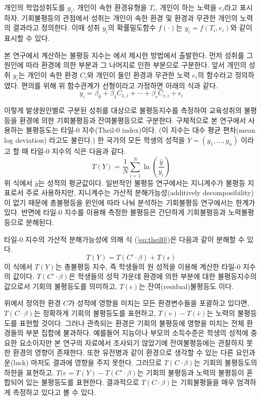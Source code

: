 개인의 학업성취도를 $y_i$, 개인이 속한 환경유형을 $T_i$, 개인이 하는 노력을 $e_i$라고 표시하자.
기회불평등의 관점에서 성취는 개인이 속한 환경 및 환경과 무관한 개인의 노력의 결과라고 정의한다.
이때 성취 $y_i$의 확률밀도함수 $f(\cdot)$는 $ y_i = f(T_i, e_i)$와 같이 표시할 수 있다.

본 연구에서 계산하는 불평등 지수는 \cite{fng11}에서 제시한 방법에서 출발한다.
먼저 성취를 그 원인에 따라 환경에 의한 부분과 그 나머지로 인한 부분으로 구분한다.
앞서 개인의 성취 $y_i$는 개인이 속한 환경 $C_i$와 개인이 들인 환경과 무관한 노력 $e_i$의 함수라고 정의하였다.
편의를 위해 위 함수관계가 선형이라고 가정하면 아래의 식과 같다.
\begin{equation}
\label{eq:ols}
 y_{i} =\beta _0 +  \beta _1 C_{1,i} + \cdots + \beta _c C_{c,i} + \epsilon _i
\end{equation}

이렇게 발생원인별로 구분된 성취를 대상으로 불평등지수를 측정하여 교육성취의 불평등을 환경에 의한 기회불평등과 잔여불평등으로 구분한다.
구체적으로 본 연구에서 사용하는 불평등도는 타일-0 지수(Theil-0 index)이다. (이 지수는 대수 평균 편차(mean log deviation) 라고도  불린다.) 
한 국가의 모든 학생의 성적을 $Y= (y_1, \ldots , y_n)$ 이라고 할 때 타일-0 지수의 식은 다음과 같다.
\begin{equation}
\label{eq:theil0}
 T(Y)=\frac{1}{N} \sum_{i=1}^{N} \ln \left(\frac{\bar{y}}{y_{i}}\right)
\end{equation} 
위 식에서 $\bar{y}$는 성적의 평균값이다.
일반적인 불평등 연구에서는 지니계수가 불평등 지표로서 주로 사용하지만, 지니계수는 가산적 분해가능성(additively decomposibility)이 없기 때문에 총불평등을 윈인에 따라 나눠 분석하는 기회불평등 연구에서는 한계가 있다.
반면에 타일-0 지수를 이용해 측정한 불평등은 간단하게 기회불평등과 노력불평등으로 분해된다.

타일-0 지수의 가산적 분해가능성에 의해 식 (\ref{eq:theil0})은 다음과 같이 분해할 수 있다.
\begin{equation}
 \label{eq:theil0-decompose}
 T(Y)=T(C ' \cdot \beta) + T(\epsilon)
\end{equation}
이 식에서 $T(Y)$는 총불평등 지수, 즉 학생들의 원 성적을 이용해 계산한 타일-0 지수의 값이다.
 $T(C ' \cdot \beta)$은 학생들의 성적 가운데 환경에 의한 부분에 대한 불평등지수의 값으로서 기회의 불평등도를 의미하고,  $T\left(\epsilon\right)$는 잔여(residual)불평등도 이다. 

위에서 정의한 환경 $C$가 성적에 영향을 미치는 모든 환경변수들을 포괄하고 있다면, $T(C \cdot \beta)$는 정확하게 기회의 불평등도를 표현하고, $T(v) - T(\bar{v})$는 노력의 불평등도를 표현할 것이다.
그러나 관측되는 환경은 기회의 불평등에 영향을 미치는 전체 환경들의 부분 집합에 불과하다.
예를들어 지능이나 부모의 소득수준은 학생의 성적에 중요한 요소이지만 본 연구의 자료에서 조사되기 않았기에 잔여불평등에는 관찰하지 못한 환경의 영향이 존재한다. 
또한 유전병과 같이 환경으로 생각할 수 있는 다른 요인과 운(luck) 마저도 결과에 영향을 주지 못한다.
그러므로 $T(C \cdot \beta)$는 기회의 불평등도의 하한을 표현하고, $T(e = T(Y) - T(C' \cdot \beta)$는 기회의 불평등과 노력의 불평등이 혼합되어 있는 불평등도를 표현한다.
결과적으로 $T(C \cdot \beta)$는 기회불평들을 매우 엄격하게 측정하고 있다고 볼 수 있다.
 
